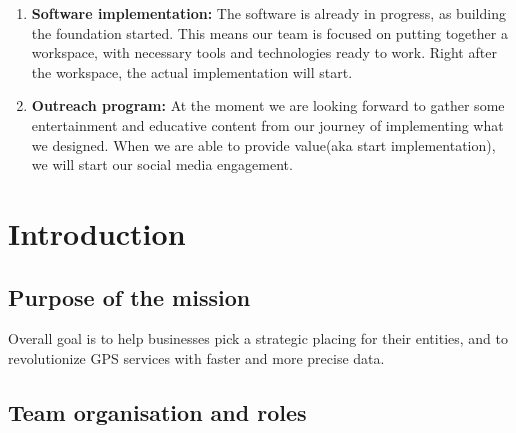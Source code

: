 \documentclass[11pt]{article}
\begin{document}
\begin{enumerate}
    \item\textbf{Software implementation:} {The software is already in progress, as building the foundation started. This means our team is focused on putting together a workspace, with necessary tools and technologies ready to work. Right after the workspace, the actual implementation will start.}
    \item\textbf{Outreach program:} {At the moment we are looking forward to gather some entertainment and educative content from our journey of implementing what we designed. When we are able to provide value(aka start implementation), we will start our social media engagement.}
\end{enumerate}





\section{Introduction}

\subsection{Purpose of the mission}
\hspace{0.5cm} Overall goal is to help businesses pick a strategic placing for their entities, and to revolutionize GPS services with faster and more precise data. 

\subsection{Team organisation and roles}
\end{document}
